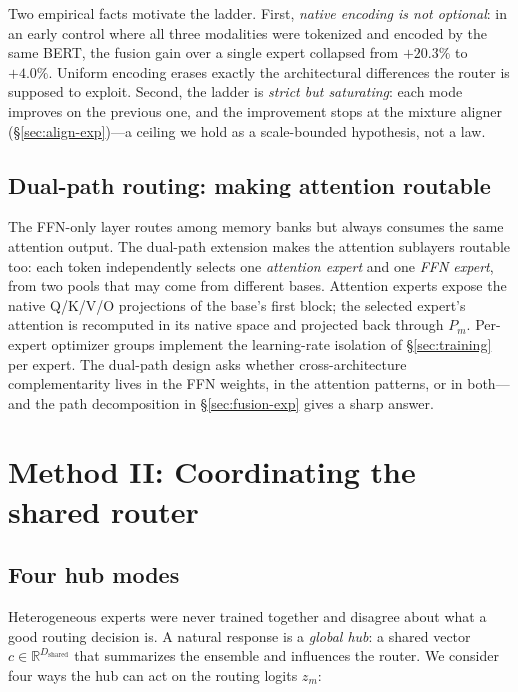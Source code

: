 \documentclass[10pt]{article}
\newcommand{\R}{\mathbb{R}}
\theoremstyle{definition}
\theoremstyle{plain}
\theoremstyle{remark}
\begin{document}
Two empirical facts motivate the ladder. First, \emph{native encoding is not optional}: in an early control where all three modalities were tokenized and encoded by the same BERT, the fusion gain over a single expert collapsed from $+20.3\%$ to $+4.0\%$. Uniform encoding erases exactly the architectural differences the router is supposed to exploit. Second, the ladder is \emph{strict but saturating}: each mode improves on the previous one, and the improvement stops at the mixture aligner (\S\ref{sec:align-exp})---a ceiling we hold as a scale-bounded hypothesis, not a law.

\subsection{Dual-path routing: making attention routable}
\label{sec:dualpath}

The FFN-only layer routes among memory banks but always consumes the same attention output. The dual-path extension makes the attention sublayers routable too: each token independently selects one \emph{attention expert} and one \emph{FFN expert}, from two pools that may come from different bases. Attention experts expose the native Q/K/V/O projections of the base's first block; the selected expert's attention is recomputed in its native space and projected back through $P_m$. Per-expert optimizer groups implement the learning-rate isolation of \S\ref{sec:training} per expert. The dual-path design asks whether cross-architecture complementarity lives in the FFN weights, in the attention patterns, or in both---and the path decomposition in \S\ref{sec:fusion-exp} gives a sharp answer.

\section{Method II: Coordinating the shared router}
\label{sec:hub}

\subsection{Four hub modes}
\label{sec:modes}

Heterogeneous experts were never trained together and disagree about what a good routing decision is. A natural response is a \emph{global hub}: a shared vector $c \in \R^{D_{\text{shared}}}$ that summarizes the ensemble and influences the router. We consider four ways the hub can act on the routing logits $z_m$:
\end{document}
